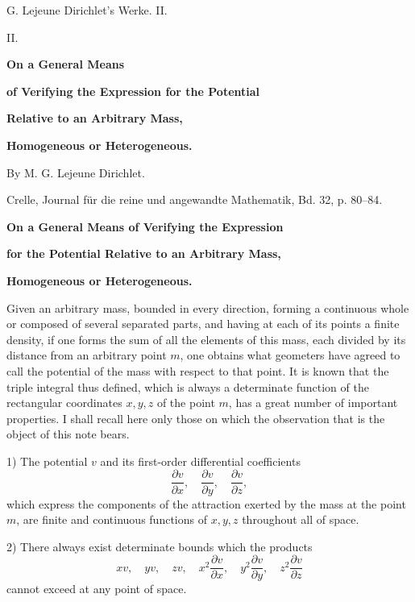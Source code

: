 \documentclass[11pt]{article}
\begin{document}
\begin{center}
{\Large G. Lejeune Dirichlet's Werke. II.}\par\vspace{1.5em}
{\Large II.}\par\vspace{0.5em}
{\LARGE \textbf{On a General Means}}\par
{\LARGE \textbf{of Verifying the Expression for the Potential}}\par
{\LARGE \textbf{Relative to an Arbitrary Mass,}}\par
{\LARGE \textbf{Homogeneous or Heterogeneous.}}\par\vspace{1em}
{\large By M. G. Lejeune Dirichlet.}\par\vspace{0.5em}
{\small Crelle, Journal für die reine und angewandte Mathematik, Bd. 32, p. 80--84.}
\end{center}

\begin{center}
\textbf{On a General Means of Verifying the Expression}\par
\textbf{for the Potential Relative to an Arbitrary Mass,}\par
\textbf{Homogeneous or Heterogeneous.}
\end{center}

Given an arbitrary mass, bounded in every direction, forming a continuous whole or composed of several separated parts, and having at each of its points a finite density, if one forms the sum of all the elements of this mass, each divided by its distance from an arbitrary point $m$, one obtains what geometers have agreed to call the potential of the mass with respect to that point. It is known that the triple integral thus defined, which is always a determinate function of the rectangular coordinates $x,y,z$ of the point $m$, has a great number of important properties. I shall recall here only those on which the observation that is the object of this note bears.

1) The potential $v$ and its first-order differential coefficients
\[
\frac{\partial v}{\partial x},\quad \frac{\partial v}{\partial y},\quad \frac{\partial v}{\partial z},
\]
which express the components of the attraction exerted by the mass at the point $m$, are finite and continuous functions of $x,y,z$ throughout all of space.

2) There always exist determinate bounds which the products
\[
 xv,\quad yv,\quad zv,\quad x^2\frac{\partial v}{\partial x},\quad y^2\frac{\partial v}{\partial y},\quad z^2\frac{\partial v}{\partial z}
\]
cannot exceed at any point of space.
\end{document}
